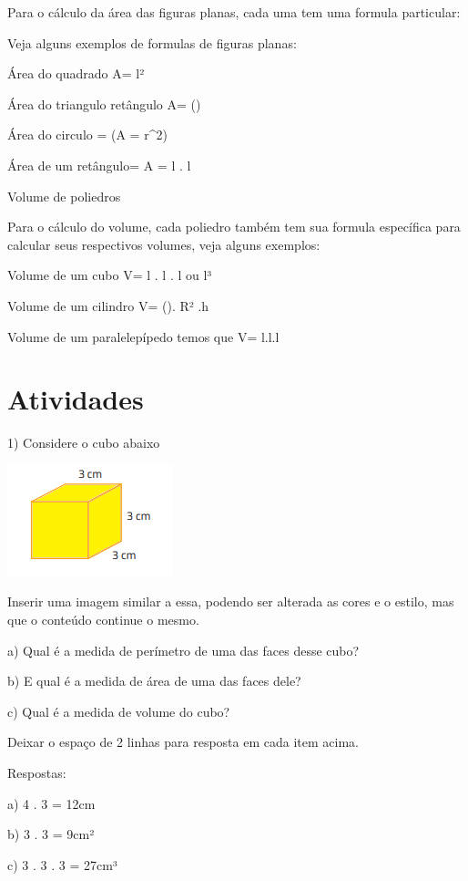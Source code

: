 Para o cálculo da área das figuras planas, cada uma tem uma formula
particular:

Veja alguns exemplos de formulas de figuras planas:

Área do quadrado A= l²

Área do triangulo retângulo A= ()


Área do circulo = (A = \pi r^{2})

Área de um retângulo= A = l . l

Volume de poliedros

Para o cálculo do volume, cada poliedro também tem sua formula
específica para calcular seus respectivos volumes, veja alguns exemplos:

Volume de um cubo V= l . l . l ou l³

Volume de um cilindro V= (\Pi). R² .h

Volume de um paralelepípedo temos que V= l.l.l

\section{Atividades}

1) Considere o cubo abaixo

\includegraphics[width=1.89583in,height=1.27083in]{./imgSAEB_8_MAT/media/image42.png}

Inserir uma imagem similar a essa, podendo ser alterada as cores e o
estilo, mas que o conteúdo continue o mesmo.

a) Qual é a medida de perímetro de uma das faces desse cubo?

b) E qual é a medida de área de uma das faces dele?

c) Qual é a medida de volume do cubo?

Deixar o espaço de 2 linhas para resposta em cada item acima.

Respostas:

a) 4 . 3 = 12cm

b) 3 . 3 = 9cm²

c) 3 . 3 . 3 = 27cm³

